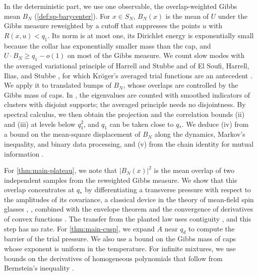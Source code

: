 In the deterministic part, we use one observable, the overlap-weighted Gibbs mean $B_N$ (\cref{def:sp-barycenter}). For $x\in S_N$, $B_N(x)$ is the mean of $U$ under the Gibbs measure reweighted by a cutoff that suppresses the points $u$ with $R(x,u)<q_1$. Its norm is at most one, its Dirichlet energy is exponentially small because the collar has exponentially smaller mass than the cap, and $U\cdot B_N\ge q_1-o(1)$ on most of the Gibbs measure. We count slow modes with the averaged variational principle of Harrell and Stubbe \cite[Theorem~3.1]{HarrellStubbe2014} and of El Soufi, Harrell, Ilias, and Stubbe \cite[Theorem~2.1]{ElSoufiHarrellIliasStubbe2017}, for which Kr\"oger's averaged trial functions are an antecedent \cite{Kroger1992}. We apply it to translated bumps of $B_N$, whose overlaps are controlled by the Gibbs mass of caps. In \cite{ElAlaouiMontanariSellke2025}, the eigenvalues are counted with smoothed indicators of clusters with disjoint supports; the averaged principle needs no disjointness. By spectral calculus, we then obtain the projection and the correlation bounds (ii) and (iii) at levels below $q_1^2$, and $q_1$ can be taken close to $q_*$. We deduce (iv) from a bound on the mean-square displacement of $B_N$ along the dynamics, Markov's inequality, and binary data processing, and (v) from the chain identity for mutual information \cite[Theorem~4.1]{PolyanskiyWu2025}.

For \cref{thm:main-plateau}, we note that $|B_N(x)|^2$ is the mean overlap of two independent samples from the reweighted Gibbs measure. We show that this overlap concentrates at $q_*$ by differentiating a transverse pressure with respect to the amplitudes of its covariance, a classical device in the theory of mean-field spin glasses \cite{Panchenko2008}, \cite[Proposition~2.2]{AuffingerElAlaouiSellke2025}, combined with the envelope theorem \cite{MilgromSegal2002} and the convergence of derivatives of convex functions \cite[Theorem~24.5]{Rockafellar1970}. The transfer from the planted law uses contiguity \cite[Lemma~3.2]{HuangMontanariPham2024}, and this step has no rate. For \cref{thm:main-cusp}, we expand $A$ near $q_d$ to compute the barrier of the trial pressure. We also use a bound on the Gibbs mass of caps whose exponent is uniform in the temperature. For infinite mixtures, we use bounds on the derivatives of homogeneous polynomials that follow from Bernstein's inequality \cite{QueffelecZarouf2019}.

